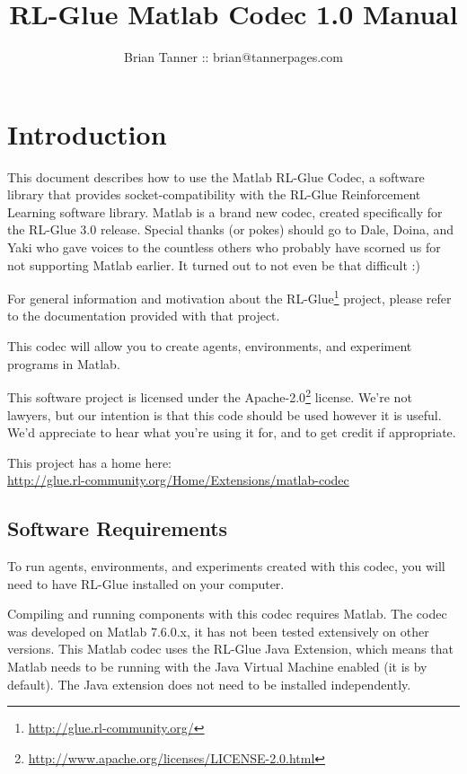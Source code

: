 \documentclass[11pt]{article}
\title{RL-Glue Matlab Codec 1.0 Manual }
\author{Brian Tanner :: brian@tannerpages.com}
\date{}
\begin{document}
\maketitle
\tableofcontents

\section{Introduction}

This document describes how to use the Matlab RL-Glue Codec, a software library that provides socket-compatibility with the RL-Glue Reinforcement Learning software library.  Matlab is a brand new codec, created specifically for the RL-Glue 3.0 release.  Special thanks (or pokes) should go to Dale, Doina, and Yaki who gave voices to the countless others who probably
have scorned us for not supporting Matlab earlier.  It turned out to not even be that difficult :)

For general information and motivation about the RL-Glue\footnote{\url{http://glue.rl-community.org/}} project, please refer to the documentation provided with that project.

This codec will allow you to create agents, environments, and experiment programs in Matlab.

This software project is licensed under the Apache-2.0\footnote{\url{http://www.apache.org/licenses/LICENSE-2.0.html}} license. We're not lawyers, but our intention is that this code 
should be used however it is useful.  We'd appreciate to hear what you're using it for, and to get credit if appropriate.

This project has a home here:\\
\url{http://glue.rl-community.org/Home/Extensions/matlab-codec}


\subsection{Software Requirements}
To run agents, environments, and experiments created with this codec, you will need to have RL-Glue installed on your computer.

Compiling and running components with this codec requires Matlab.  The codec was developed on Matlab 7.6.0.x, it has not been tested extensively on other versions.  This Matlab codec uses the RL-Glue Java Extension, which means that Matlab needs to be running with the Java Virtual Machine enabled (it is by default).  The Java extension does not need to be installed independently.
\end{document}

